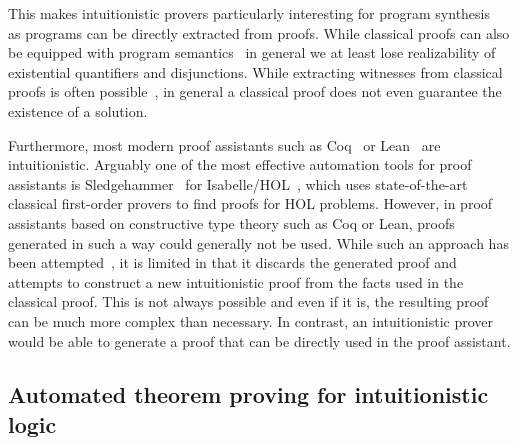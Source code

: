 \documentclass{article}
\theoremstyle{definition}
\theoremstyle{definition}
\theoremstyle{definition}
\theoremstyle{definition}
\theoremstyle{definition}
\theoremstyle{definition}
\theoremstyle{definition}
\newcommand{\0}{\mathbf 0}
\newcommand{\1}{\mathbf 1}
\begin{document}
	This makes intuitionistic provers particularly interesting for program synthesis~\cite{alur2013syntax} as programs can be directly extracted from proofs. While classical proofs can also be equipped with program semantics~\cite{Parigot1,Control1} in general we at least lose realizability of existential quantifiers and disjunctions. While extracting witnesses from classical proofs is often possible~\cite{hozzova2023program}, in general a classical proof does not even guarantee the existence of a solution.
	
	Furthermore, most modern proof assistants such as Coq~\cite{bertot2013interactive} or Lean~\cite{de2015lean} are intuitionistic. Arguably one of the most effective automation tools for proof assistants is Sledgehammer~\cite{bohme2010sledgehammer} for Isabelle/HOL~\cite{nipkow2002isabelle}, which uses state-of-the-art classical first-order provers to find proofs for HOL problems. However, in proof assistants based on constructive type theory such as Coq or Lean, proofs generated in such a way could generally not be used. While such an approach has been attempted~\cite{czajka2018hammer,hozzova2023program}, it is limited in that it discards the generated proof and attempts to construct a new intuitionistic proof from the facts used in the classical proof. This is not always possible and even if it is, the resulting proof can be much more complex than necessary. In contrast, an intuitionistic prover would be able to generate a proof that can be directly used in the proof assistant.

	\subsection{Automated theorem proving for intuitionistic logic}
\end{document}
